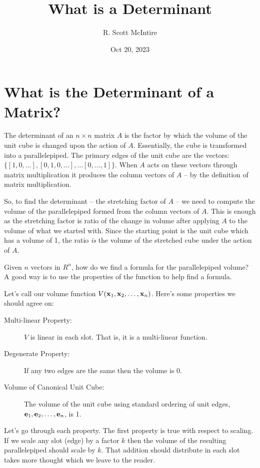 \documentclass{article}
\title{What is a Determinant}
\author{R. Scott McIntire}
\date{Oct 20, 2023}
\begin{document}
\maketitle

\section{What is the Determinant of a Matrix?}
The determinant of an $n\times n$ matrix $A$ is the factor by which the volume of
the unit cube is changed upon the action of $A$. Essentially, the cube is
transformed into a parallelepiped. The primary edges of the unit cube are the
vectors: $\{ [1, 0, \ldots], [0, 1, 0, \ldots], \ldots [0, \dots, 1]\}$.
When $A$ acts on these vectors through matrix multiplication it
produces the column vectors of $A$ -- by the definition of matrix multiplication.

So, to find the determinant -- the stretching factor of $A$ -- we need to compute the volume of the parallelepiped formed
from the column vectors of $A$. This is enough as the stretching factor is ratio of the 
change in volume after applying $A$ to the volume of what we started with.  Since the starting 
point is the unit cube which has a volume of 1, the ratio {\em is\/} the volume of the stretched cube
under the action of $A$.

Given $n$ vectors in $R^n$, how do we find a formula for the parallelepiped volume?
A good way is to use the properties of the function to help find a formula.

Let's call our volume function $V({\bf x}_1, {\bf x}_2, \ldots, {\bf x}_n)$.
Here's some properties we should agree on:
\begin{description}
\item[Multi-linear Property:]{$V$ is linear in each slot. That is,
    it is a multi-linear function.}
\item[Degenerate Property:]{If any two edges are the same then the volume is $0$.}
\item[Volume of Canonical Unit Cube:]{The volume of the unit cube using
    standard ordering of unit edges, ${\bf e}_1, {\bf e}_2, \ldots , {\bf e}_n$, is 1.}
\end{description}
Let's go through each property.
The first property is true with respect to scaling. If we scale any slot
(edge) by a factor
$k$ then the volume of the resulting parallelepiped should scale by $k$.
That addition should distribute in each slot takes more thought which we leave
to the reader.
\end{document}
